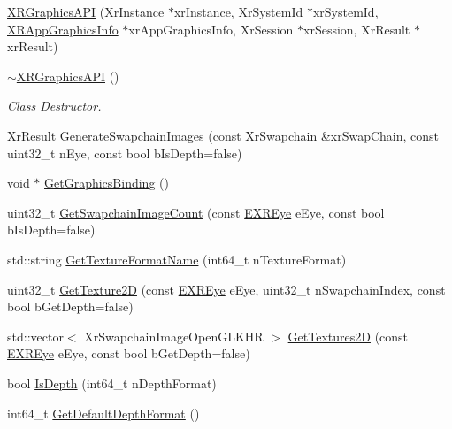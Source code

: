 \begin{DoxyCompactItemize}
\item 
\mbox{\hyperlink{class_open_x_r_provider_1_1_x_r_graphics_a_p_i_a7e10c7996b39f1f5740a2a0145e25a9c}{X\+R\+Graphics\+A\+PI}} (Xr\+Instance $\ast$xr\+Instance, Xr\+System\+Id $\ast$xr\+System\+Id, \mbox{\hyperlink{struct_open_x_r_provider_1_1_x_r_app_graphics_info}{X\+R\+App\+Graphics\+Info}} $\ast$xr\+App\+Graphics\+Info, Xr\+Session $\ast$xr\+Session, Xr\+Result $\ast$xr\+Result)
\item 
\mbox{\hyperlink{class_open_x_r_provider_1_1_x_r_graphics_a_p_i_af28c914f792ab81e991644d517ce054c}{$\sim$\+X\+R\+Graphics\+A\+PI}} ()
\begin{DoxyCompactList}\small\item\em Class Destructor. \end{DoxyCompactList}\item 
Xr\+Result \mbox{\hyperlink{class_open_x_r_provider_1_1_x_r_graphics_a_p_i_a093e5898b7868dad3beebc3d3ed63054}{Generate\+Swapchain\+Images}} (const Xr\+Swapchain \&xr\+Swap\+Chain, const uint32\+\_\+t n\+Eye, const bool b\+Is\+Depth=false)
\item 
void $\ast$ \mbox{\hyperlink{class_open_x_r_provider_1_1_x_r_graphics_a_p_i_a2c474282e17bf45b87bae7e0c95efa57}{Get\+Graphics\+Binding}} ()
\item 
uint32\+\_\+t \mbox{\hyperlink{class_open_x_r_provider_1_1_x_r_graphics_a_p_i_a41503928a4dfb8832ee9485228fe8372}{Get\+Swapchain\+Image\+Count}} (const \mbox{\hyperlink{namespace_open_x_r_provider_a8aa379869e30772896e6c468eb54f155}{E\+X\+R\+Eye}} e\+Eye, const bool b\+Is\+Depth=false)
\item 
std\+::string \mbox{\hyperlink{class_open_x_r_provider_1_1_x_r_graphics_a_p_i_a6ff0969adb40b16428d5489d07c1d4f5}{Get\+Texture\+Format\+Name}} (int64\+\_\+t n\+Texture\+Format)
\item 
uint32\+\_\+t \mbox{\hyperlink{class_open_x_r_provider_1_1_x_r_graphics_a_p_i_abb6b87fd88ffb9df871405acefc90011}{Get\+Texture2D}} (const \mbox{\hyperlink{namespace_open_x_r_provider_a8aa379869e30772896e6c468eb54f155}{E\+X\+R\+Eye}} e\+Eye, uint32\+\_\+t n\+Swapchain\+Index, const bool b\+Get\+Depth=false)
\item 
std\+::vector$<$ Xr\+Swapchain\+Image\+Open\+G\+L\+K\+HR $>$ \mbox{\hyperlink{class_open_x_r_provider_1_1_x_r_graphics_a_p_i_ae3cfae0f48a2095420b3f0e3319ab2a1}{Get\+Textures2D}} (const \mbox{\hyperlink{namespace_open_x_r_provider_a8aa379869e30772896e6c468eb54f155}{E\+X\+R\+Eye}} e\+Eye, const bool b\+Get\+Depth=false)
\item 
bool \mbox{\hyperlink{class_open_x_r_provider_1_1_x_r_graphics_a_p_i_aaf7cedacd99180d7ef1c3d4da85aba3b}{Is\+Depth}} (int64\+\_\+t n\+Depth\+Format)
\item 
int64\+\_\+t \mbox{\hyperlink{class_open_x_r_provider_1_1_x_r_graphics_a_p_i_a40a8a4e304fb260d46a9f4f9fa7b0e1b}{Get\+Default\+Depth\+Format}} ()
\end{DoxyCompactItemize}

